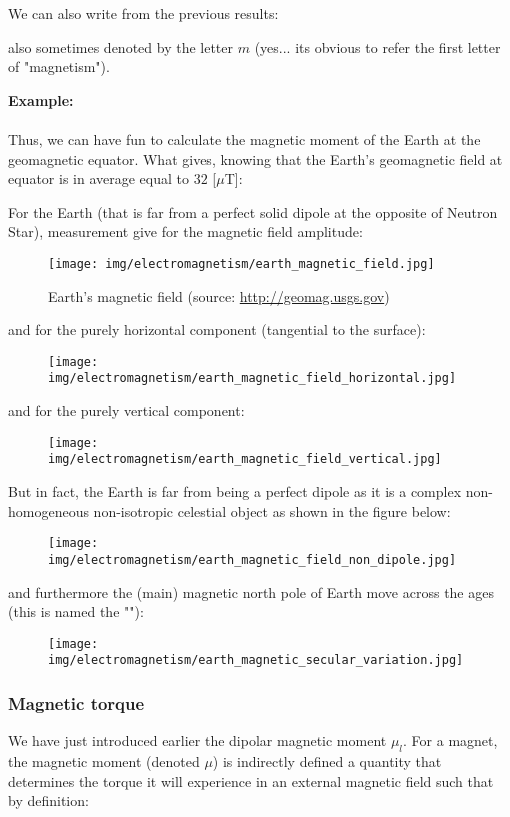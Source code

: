 	We can also write from the previous results:
	
	also sometimes denoted by the letter $m$ (yes... its obvious to refer the first letter of "magnetism").
	
	\begin{tcolorbox}[colframe=black,colback=white,sharp corners]
	\textbf{{\Large {}}Example:}\\\\
	Thus, we can have fun to calculate the magnetic moment of the Earth at the geomagnetic equator. What gives, knowing that the Earth's geomagnetic field  at equator is in average equal to $32$ [$\mu$T]:
	
	\end{tcolorbox}
	For the Earth (that is far from a perfect solid dipole at the opposite of Neutron Star), measurement give for the magnetic field amplitude:
	\begin{figure}[H]
		\centering
		\texttt{[image: img/electromagnetism/earth\_magnetic\_field.jpg]}
		\caption[Earth's magnetic field]{Earth's magnetic field (source: \url{http://geomag.usgs.gov})}
	\end{figure}
	and for the purely horizontal component (tangential to the surface):
	\begin{figure}[H]
		\centering
		\texttt{[image: img/electromagnetism/earth\_magnetic\_field\_horizontal.jpg]}
	\end{figure}
	and for the purely vertical component:
	\begin{figure}[H]
		\centering
		\texttt{[image: img/electromagnetism/earth\_magnetic\_field\_vertical.jpg]}
	\end{figure}
	But in fact, the Earth is far from being a perfect dipole as it is a complex non-homogeneous non-isotropic celestial object as shown in the figure below:
	\begin{figure}[H]
		\centering
		\texttt{[image: img/electromagnetism/earth\_magnetic\_field\_non\_dipole.jpg]}
	\end{figure}
	and furthermore the (main) magnetic north pole of Earth move across the ages (this is named the ""):
	\begin{figure}[H]
		\centering
		\texttt{[image: img/electromagnetism/earth\_magnetic\_secular\_variation.jpg]}
	\end{figure}
	
	\pagebreak
	\subsubsection{Magnetic torque}\label{magnetic torque}
	We have just introduced earlier the dipolar magnetic moment $\mu_l$. For a magnet, the magnetic moment (denoted $\mu$) is indirectly defined a quantity that determines the torque it will experience in an external magnetic field such that by definition:
	
